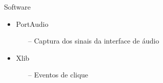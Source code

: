\begin{frame}{Software}
\begin{itemize}
\item PortAudio
\begin{itemize}
\smallskip
\item[--] Captura dos sinais da interface de \'audio
\end{itemize}
\bigskip
\item Xlib
\begin{itemize}
\smallskip
\item[--] Eventos de clique
\end{itemize}
\end{itemize}
\end{frame}



